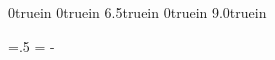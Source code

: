 %
%
%
% 
%
\oddsidemargin   0truein
\evensidemargin  0truein
\textwidth 6.5truein
\topmargin 0truein
\headheight 0pt
\headsep 0pt
\textheight 9.0truein

\def\phone#1{\def\ph@ne{#1}}
\phone{(352) 644-3218}
\def\emailaddress{}
\def\email#1{\def\emailaddress{{\tensl\ email: \tentt #1}}}

\def\ps@firstpage{\def\@oddhead{}\def\@oddfoot{}%
    \def\evenhead{}\def\evenfoot{}}

%
\longindentation=.5\textwidth
\indentedwidth=\textwidth
\advance\indentedwidth -\longindentation
%
%
\def\@texttop{}

